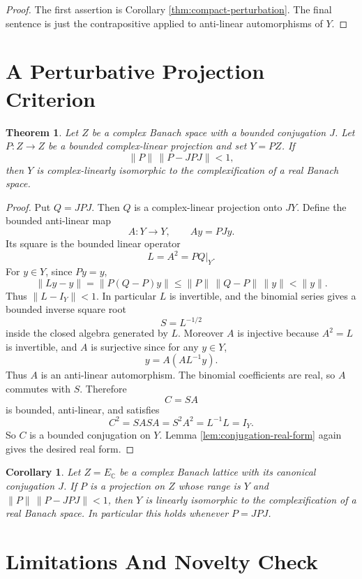 \documentclass[11pt]{article}
\newtheorem{theorem}{Theorem}
\newtheorem{corollary}{Corollary}
\theoremstyle{remark}
\newcommand{\C}{\mathbb C}
\begin{document}
\begin{proof}
The first assertion is Corollary \ref{thm:compact-perturbation}.  The final
sentence is just the contrapositive applied to anti-linear automorphisms of
\(Y\).
\end{proof}

\section{A Perturbative Projection Criterion}

\begin{theorem}\label{thm:near-real-projection}
Let \(Z\) be a complex Banach space with a bounded conjugation \(J\).  Let
\(P:Z\to Z\) be a bounded complex-linear projection and set \(Y=PZ\).  If
\[
  \|P\|\,\|P-JPJ\|<1,
\]
then \(Y\) is complex-linearly isomorphic to the complexification of a real
Banach space.
\end{theorem}

\begin{proof}
Put \(Q=JPJ\).  Then \(Q\) is a complex-linear projection onto \(JY\).  Define
the bounded anti-linear map
\[
  A:Y\to Y,\qquad Ay=PJy .
\]
Its square is the bounded linear operator
\[
  L=A^2=PQ|_Y .
\]
For \(y\in Y\), since \(Py=y\),
\[
  \|Ly-y\|=\|P(Q-P)y\|
    \leq \|P\|\,\|Q-P\|\,\|y\| < \|y\|.
\]
Thus \(\|L-I_Y\|<1\).  In particular \(L\) is invertible, and the binomial
series gives a bounded inverse square root
\[
  S=L^{-1/2}
\]
inside the closed algebra generated by \(L\).  Moreover \(A\) is injective
because \(A^2=L\) is invertible, and \(A\) is surjective since for any
\(y\in Y\),
\[
  y=A(A L^{-1}y).
\]
Thus \(A\) is an anti-linear automorphism.  The binomial coefficients are real,
so \(A\) commutes with \(S\).  Therefore
\[
  C=SA
\]
is bounded, anti-linear, and satisfies
\[
  C^2=SASA=S^2A^2=L^{-1}L=I_Y .
\]
So \(C\) is a bounded conjugation on \(Y\).  Lemma
\ref{lem:conjugation-real-form} again gives the desired real form.
\end{proof}

\begin{corollary}
Let \(Z=E_\C\) be a complex Banach lattice with its canonical conjugation
\(J\).  If \(P\) is a projection on \(Z\) whose range is \(Y\) and
\(\|P\|\,\|P-JPJ\|<1\), then \(Y\) is linearly isomorphic to the
complexification of a real Banach space.  In particular this holds whenever
\(P=JPJ\).
\end{corollary}

\section{Limitations And Novelty Check}
\end{document}
